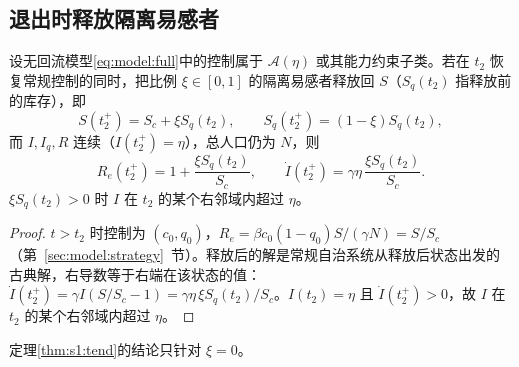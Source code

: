 \subsection{退出时释放隔离易感者}
\label{sec:proof:return:release}
设无回流模型\eqref{eq:model:full}中的控制属于 $\mathcal A(\eta)$ 或其能力约束子类。若在 $t_2$ 恢复常规控制的同时，把比例 $\xi\in[0,1]$ 的隔离易感者释放回 $S$（$S_q(t_2)$ 指释放前的库存），即
\[
S(t_2^+)=S_c+\xi S_q(t_2),\qquad S_q(t_2^+)=(1-\xi)S_q(t_2),
\]
而 $I,I_q,R$ 连续（$I(t_2^+)=\eta$），总人口仍为 $N$，则
\[
R_e(t_2^+)=1+\frac{\xi S_q(t_2)}{S_c},\qquad \dot I(t_2^+)=\gamma\eta\,\frac{\xi S_q(t_2)}{S_c}.
\]
$\xi S_q(t_2)>0$ 时 $I$ 在 $t_2$ 的某个右邻域内超过 $\eta$。
\begin{proof}
$t>t_2$ 时控制为 $(c_0,q_0)$，$R_e=\beta c_0(1-q_0)S/(\gamma N)=S/S_c$（第~\ref{sec:model:strategy}~节）。释放后的解是常规自治系统从释放后状态出发的古典解，右导数等于右端在该状态的值：$\dot I(t_2^+)=\gamma I(S/S_c-1)=\gamma\eta\,\xi S_q(t_2)/S_c$。$I(t_2)=\eta$ 且 $\dot I(t_2^+)>0$，故 $I$ 在 $t_2$ 的某个右邻域内超过 $\eta$。
\end{proof}
定理\ref{thm:s1:tend}的结论只针对 $\xi=0$。
